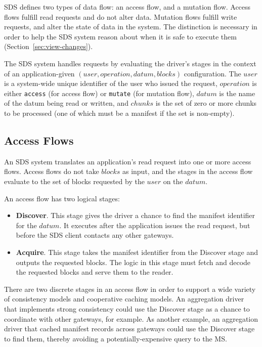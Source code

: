 SDS defines two types of data flow:  an access flow, and a mutation flow.
Access flows fulfill read requests and do not alter data.  Mutation flows fulfill write requests, and alter
the state of data in the system.  The distinction is necessary in order to help
the SDS system reason about when it is safe to execute them
(Section~\ref{sec:view-changes}).

The SDS system handles requests by evaluating the driver's stages in the context of
an application-given $(user, operation, datum, blocks)$ configuration.  The
$user$ is a system-wide unique identifier of the user who issued the request,
$operation$ is either \texttt{access} (for access flow) or \texttt{mutate} (for
mutation flow), $datum$ is the name of the datum being read or written, and
$chunks$ is the set of zero or more chunks to be processed (one of which must be
a manifest if the set is non-empty).

\subsection{Access Flows}

An SDS system translates an application's read request into one or more access
flows.  Access flows do not take $blocks$ as input, and the stages in the access
flow evaluate to the set of blocks requested by the $user$ on the $datum$.

An access flow has two logical stages:

\begin{itemize}
    \item \textbf{Discover}.  This stage gives the driver a chance to find the
manifest identifier for the $datum$.  It executes after the application issues
the read request, but before the SDS client contacts any other gateways.
    \item \textbf{Acquire}.  This stage takes the manifest identifier from the
Discover stage and outputs the requested blocks.  The logic in this 
stage must fetch and decode the requested blocks and serve them to the reader.
\end{itemize}

There are two discrete stages in an access flow in order to support a wide
variety of consistency models and cooperative caching models.  An
aggregation driver that implements strong consistency could use the Discover
stage as a chance to coordinate with other gateways, for example.  As
another example, an aggregation driver that cached manifest records
across gateways could use the Discover stage to find them, thereby avoiding a
potentially-expensive query to the MS.

